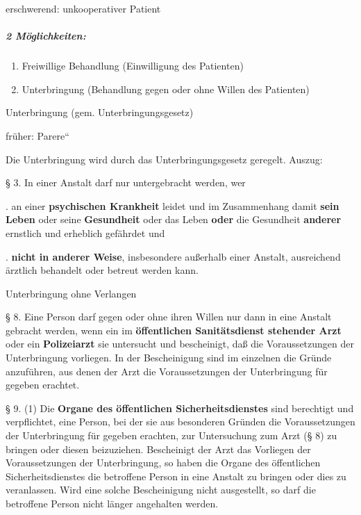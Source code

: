{\mdseries
erschwerend: unkooperativer Patient}

\subparagraph*{2 Möglichkeiten:}

\begin{enumerate}
\item Freiwillige Behandlung (Einwilligung des Patienten)

\item Unterbringung (Behandlung gegen oder ohne Willen des Patienten)

\end{enumerate}
{\mdseries\color[rgb]{0.0,0.0,0.5019608}
Unterbringung (gem. Unterbringungsgesetz) }

{\mdseries
fr\"uher: {\quotedblbase}Parere{\textquotedblleft}}

{\mdseries
Die Unterbringung wird durch das
Unterbringungsgesetz geregelt. Auszug:}

{\mdseries
{\S} 3. In einer Anstalt darf nur untergebracht werden, wer}

{. an einer \textbf{psychischen Krankheit} leidet und im Zusammenhang
damit \textbf{sein Leben} oder seine \textbf{Gesundheit} oder das Leben
\textbf{oder} die Gesundheit \textbf{anderer} ernstlich und erheblich
gefährdet und}

{. \textbf{nicht in anderer Weise}, insbesondere au{\ss}erhalb einer
Anstalt, ausreichend ärztlich behandelt oder betreut werden kann.}

{\mdseries
Unterbringung ohne Verlangen}

{\mdseries
{\S} 8. Eine Person darf gegen oder ohne ihren Willen nur dann in eine
Anstalt gebracht werden, wenn ein im \textbf{öffentlichen
Sanitätsdienst stehender Arzt} oder ein \textbf{Polizeiarzt} sie
untersucht und bescheinigt, da{\ss} die Voraussetzungen der
Unterbringung vorliegen. In der Bescheinigung sind im einzelnen die
Gr\"unde anzuf\"uhren, aus denen der Arzt die Voraussetzungen der
Unterbringung f\"ur gegeben erachtet.}

{\mdseries
{\S} 9. (1) Die \textbf{Organe des öffentlichen Sicherheitsdienstes}
sind berechtigt und verpflichtet, eine Person, bei der sie aus
besonderen Gr\"unden die Voraussetzungen der Unterbringung f\"ur
gegeben erachten, zur Untersuchung zum Arzt ({\S} 8) zu bringen oder
diesen beizuziehen. Bescheinigt der Arzt das Vorliegen der
Voraussetzungen der Unterbringung, so haben die Organe des
öffentlichen Sicherheitsdienstes die betroffene Person in eine
Anstalt zu bringen oder dies zu veranlassen. Wird eine solche
Bescheinigung nicht ausgestellt, so darf die betroffene Person nicht
länger angehalten werden.}

